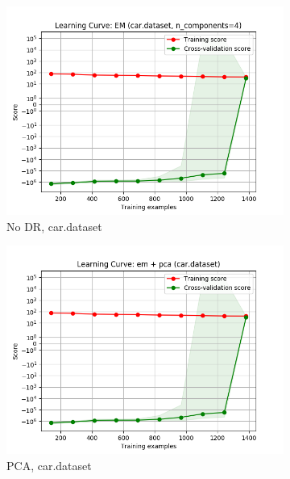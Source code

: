 \documentclass{article}
\begin{document}
    \begin{figure}[htb]
    \centering

      \begin{subfigure}{0.33\textwidth}
        \includegraphics[width=\linewidth]{out/em/car-learning.png}
        \caption{No DR, car.dataset}
      \end{subfigure}\hfil
      \begin{subfigure}{0.33\textwidth}
        \includegraphics[width=\linewidth]{out/cluster_dr/car-em-pca-learning.png}
        \caption{PCA, car.dataset}
      \end{subfigure}\hfil
      \begin{subfigure}{0.33\textwidth}

\end{subfigure}
\end{figure}
\end{document}
